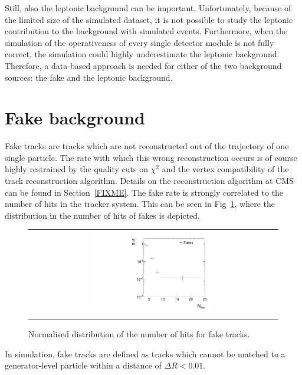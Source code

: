 Still, also the leptonic background can be important.
Unfortunately, because of the limited size of the simulated \WJets dataset, it is not possible to study the leptonic contribution to the background with simulated events.
Furthermore, when the simulation of the operativeness of every single detector module is not fully correct, the simulation could highly underestimate the leptonic background.\\

Therefore, a data-based approach is needed for either of the two background sources: the fake and the leptonic background.
\section{Fake background}
\label{sec:FakeBkg}
Fake tracks are tracks which are not reconstructed out of the trajectory of one single particle.
The rate with which this wrong reconstruction occurs is of course highly restrained by the quality cuts on $\chi^2$ and the vertex compatibility of the track reconstruction algorithm.
Details on the reconstruction algorithm at CMS can be found in Section~\ref{FIXME}.
The fake rate is strongly correlated to the number of hits in the tracker system. 
This can be seen in Fig~\ref{fig:NValidFakes}, where the distribution in the number of hits of fakes is depicted.
\begin{figure}[!bt]
  \centering 
  \begin{tabular}{c}
    \includegraphics[width=0.49\textwidth]{figures/analysis/NValidForFakes_chiTracksfullSelectionNoQCDCutsNoTrigger_PtGt15GeV.pdf}
  \end{tabular}
  \caption{Normalised distribution of the number of hits for fake tracks.}
  \label{fig:NValidFakes}
\end{figure}
In simulation, fake tracks are defined as tracks which cannot be matched to a generator-level particle within a distance of $\Delta R < 0.01$.

